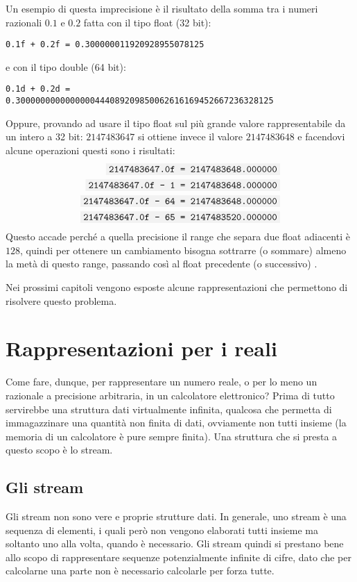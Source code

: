 \documentclass[Lau]{sapthesis}
\newcommand{\code}[1]{\colorbox{light-gray}{\texttt{#1}}}
\begin{document}
Un esempio di questa imprecisione è il risultato della somma tra i numeri razionali $0.1$ e $0.2$ fatta con il tipo float (32 bit):
\begin{center}
\code{0.1f + 0.2f = 0.300000011920928955078125}
\end{center}
e con il tipo double (64 bit):
\begin{center}
\code{0.1d + 0.2d =}\\
\code{0.3000000000000000444089209850062616169452667236328125}
\end{center}

Oppure, provando ad usare il tipo float sul più grande valore rappresentabile da un intero a 32 bit: $2147483647$ si ottiene invece il valore $2147483648$ e facendovi alcune operazioni questi sono i risultati:
\begin{align*}
\code{2147483647.0f = 2147483648.000000}\\
\code{2147483647.0f - 1 = 2147483648.000000}\\
\code{2147483647.0f - 64 = 2147483648.000000}\\
\code{2147483647.0f - 65 = 2147483520.000000}\\
\end{align*}
Questo accade perché a quella precisione il range che separa due float adiacenti è $128$, quindi per ottenere un cambiamento bisogna sottrarre (o sommare) almeno la metà di questo range, passando così al float precedente (o successivo) \cite{97Things}.

\medskip

Nei prossimi capitoli vengono esposte alcune rappresentazioni che 
permettono di risolvere questo problema.


\section{Rappresentazioni per i reali}
Come fare, dunque, per rappresentare un numero reale, o per lo meno un razionale 
a precisione arbitraria, in un calcolatore elettronico? Prima di tutto 
servirebbe una struttura dati virtualmente infinita, qualcosa che permetta di 
immagazzinare una quantità non finita di dati, ovviamente non tutti insieme (la 
memoria di un calcolatore è pure sempre finita). Una struttura che si presta a 
questo scopo è lo stream.


\subsection{Gli stream}
Gli stream non sono vere e proprie strutture dati. In generale, uno stream è una 
sequenza di elementi, i quali però non vengono elaborati tutti insieme ma 
soltanto uno alla volta, quando è necessario. Gli stream quindi si prestano bene 
allo scopo di rappresentare sequenze potenzialmente infinite di cifre, dato che 
per calcolarne una parte non è necessario calcolarle per forza tutte.
\end{document}
